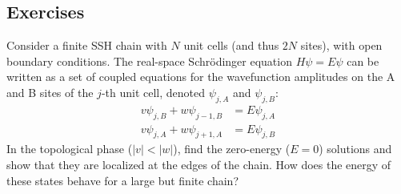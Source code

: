 \subsection*{Exercises}
\begin{exercise}
    Consider a finite SSH chain with $N$ unit cells (and thus $2N$ sites), with open boundary conditions. The real-space Schrödinger equation $H\psi = E\psi$ can be written as a set of coupled equations for the wavefunction amplitudes on the A and B sites of the $j$-th unit cell, denoted $\psi_{j,A}$ and $\psi_{j,B}$:
    \begin{align*}
        v \psi_{j,B} + w \psi_{j-1, B} &= E \psi_{j,A} \\
        v \psi_{j,A} + w \psi_{j+1, A} &= E \psi_{j,B}
    \end{align*}
    In the topological phase ($|v| < |w|$), find the zero-energy ($E=0$) solutions and show that they are localized at the edges of the chain. How does the energy of these states behave for a large but finite chain?
\end{exercise}

